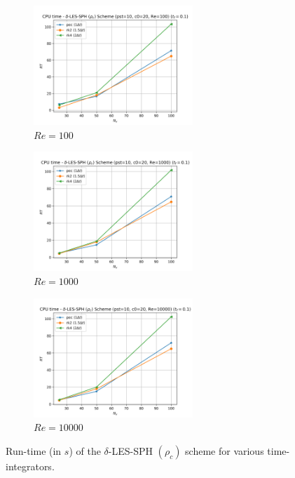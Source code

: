 \begin{figure}[htbp!]
  \begin{subfigure}{7cm}
    \centering\includegraphics[width=6cm]{Code-Figures/deltales/integrator/pois_rt_pst_10_c0_20_re_100.png}
    \caption{$Re = 100$}
  \end{subfigure}
  \begin{subfigure}{7cm}
    \centering\includegraphics[width=6cm]{Code-Figures/deltales/integrator/pois_rt_pst_10_c0_20_re_1000.png}
    \caption{$Re = 1000$}
  \end{subfigure}
  \begin{subfigure}{7cm}
    \centering\includegraphics[width=6cm]{Code-Figures/deltales/integrator/pois_rt_pst_10_c0_20_re_10000.png}
    \caption{$Re = 10000$}
  \end{subfigure}
  \caption{Run-time (in $s$) of the $\delta$-LES-SPH $(\rho_c)$ scheme for various time-integrators.}
  \label{fig:deltales-integrator-rt}
\end{figure}

